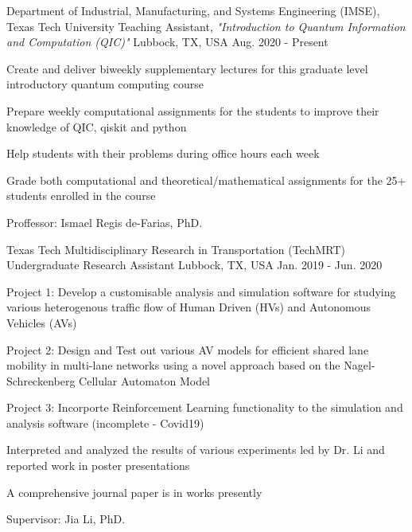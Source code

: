 \begin{cventries}
    \cventry
    {Department of  Industrial, Manufacturing, and Systems Engineering (IMSE), Texas Tech University}
    {Teaching Assistant, \textit{"Introduction to Quantum Information and Computation (QIC)"}}
    {Lubbock, TX, USA}
    {Aug. 2020 - Present}
    {
        \begin{cvitems}
        \item{Create and deliver biweekly supplementary lectures for this graduate level introductory quantum computing course}
        \item{Prepare weekly computational assignments for the students to improve their knowledge of QIC, qiskit and python}
        \item{Help students with their problems during office hours each week}
        \item{Grade both computational and theoretical/mathematical assignments for the 25+ students enrolled in the course}
        \item{Proffessor: Ismael Regis de-Farias, PhD.}
        \end{cvitems}
        \vspace{1em}
    }

    \cventry
    {Texas Tech Multidisciplinary Research in Transportation (TechMRT)}
    {Undergraduate Research Assistant}
    {Lubbock, TX, USA}
    {Jan. 2019 - Jun. 2020}
    {
        \begin{cvitems}
        \item{Project 1: Develop a customisable analysis and simulation software for studying various heterogenous traffic flow of Human Driven (HVs) and Autonomous Vehicles (AVs)}
        \item{Project 2: Design and Test out various AV models for efficient shared lane mobility in multi-lane networks using a novel approach based on the Nagel-Schreckenberg Cellular Automaton Model}
        \item{Project 3: Incorporte Reinforcement Learning functionality to the simulation and analysis software (incomplete - Covid19)}
    \item{Interpreted and analyzed the results of various experiments led by Dr. Li and reported work in poster presentations}
    \item{A comprehensive journal paper is in works presently}
        \item{Supervisor: Jia Li, PhD.}
        \end{cvitems}
        \vspace{1em}
    }


\end{cventries}
